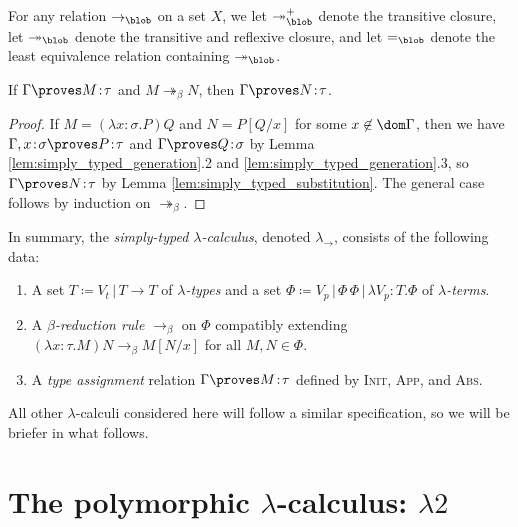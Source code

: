 \documentclass[reqno]{amsart}
\begin{document}
    \begin{notation}
        For any relation $\rightarrow_\blob$ on a set $X$, we let $\twoheadrightarrow_\blob^+$ denote the transitive closure, let $\twoheadrightarrow_\blob$ denote the transitive and reflexive closure, and let $=_\blob$ denote the least equivalence relation containing $\twoheadrightarrow_\blob$.
    \end{notation}

    \begin{theorem}\label{thm:simply_typed_subject_reduction}
        If $\Gamma\proves M\!:\!\tau$ and $M\twoheadrightarrow_\beta N$, then $\Gamma\proves N\!:\!\tau$.
    \end{theorem}
    \begin{proof}
        If $M=(\lambda x\!:\!\sigma.P)Q$ and $N=P[Q/x]$ for some $x\not\in\dom\Gamma$, then we have $\Gamma,x\!:\!\sigma\proves P\!:\!\tau$ and $\Gamma\proves Q\!:\!\sigma$ by Lemma \ref{lem:simply_typed_generation}.2 and \ref{lem:simply_typed_generation}.3, so $\Gamma\proves N\!:\!\tau$ by Lemma \ref{lem:simply_typed_substitution}. The general case follows by induction on $\twoheadrightarrow_\beta$.
    \end{proof}

    In summary, the \textit{simply-typed $\lambda$-calculus}, denoted $\lambda_\rightarrow$, consists of the following data:
    \begin{enumerate}
        \item A set $T\coloneqq V_t\,|\,T\rightarrow T$ of \textit{$\lambda$-types} and a set $\Phi\coloneqq V_p\,|\,\Phi\,\Phi\,|\,\lambda V_p\!:\!T.\Phi$ of \textit{$\lambda$-terms}.
        \item A \textit{$\beta$-reduction rule} $\rightarrow_\beta$ on $\Phi$ compatibly extending $(\lambda x\!:\!\tau.M)N\rightarrow_\beta M[N/x]$ for all $M,N\in\Phi$.
        \item A \textit{type assignment} relation $\Gamma\proves M\!:\!\tau$ defined by \textsc{Init}, \textsc{App}, and \textsc{Abs}.
    \end{enumerate}
    All other $\lambda$-calculi considered here will follow a similar specification, so we will be briefer in what follows.

    \section{The polymorphic $\lambda$-calculus: $\lambda2$}
\end{document}

